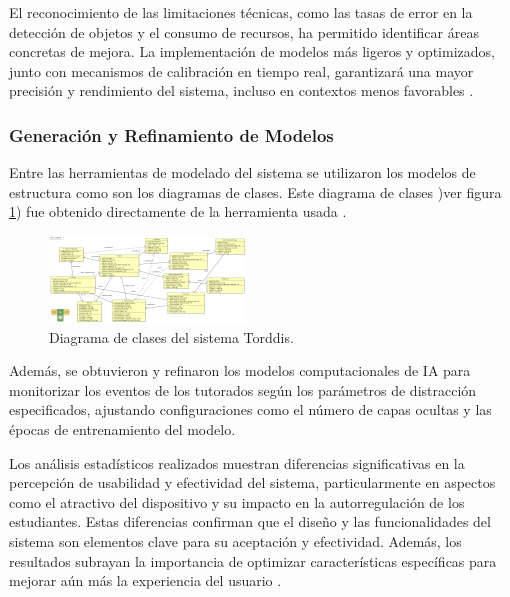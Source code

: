 \documentclass[a4paper,fleqn]{cas-sc}
\begin{document}
				El reconocimiento de las limitaciones técnicas, como las tasas de error en la detección de objetos y el consumo de recursos, ha permitido identificar áreas concretas de mejora. La implementación de modelos más ligeros y optimizados, junto con mecanismos de calibración en tiempo real, garantizará una mayor precisión y rendimiento del sistema, incluso en contextos menos favorables \citep{Falzetti2024Promoting}.
				
			\subsubsection{Generación y Refinamiento de Modelos}
				Entre las herramientas de modelado del sistema  se utilizaron los modelos de estructura como son los diagramas de clases. Este diagrama de clases )ver figura \ref{fig:ClassDiagram}) fue obtenido directamente de la herramienta usada \citep{Guerrero2024Test}.
				
				\begin{figure}[hbt!]
					\centering
					\includegraphics[frame,scale=0.5, width=\linewidth]{figs/Figure_8}
					\caption{Diagrama de clases del sistema Torddis.\label{fig:ClassDiagram}}
				\end{figure} 
				
				Además, se obtuvieron y refinaron los modelos computacionales de IA para monitorizar los eventos de los tutorados según los parámetros de distracción especificados, ajustando configuraciones como el número de capas ocultas y las épocas de entrenamiento del modelo.
				
				Los análisis estadísticos realizados muestran diferencias significativas en la percepción de usabilidad y efectividad del sistema, particularmente en aspectos como el atractivo del dispositivo y su impacto en la autorregulación de los estudiantes. Estas diferencias confirman que el diseño y las funcionalidades del sistema son elementos clave para su aceptación y efectividad. Además, los resultados subrayan la importancia de optimizar características específicas para mejorar aún más la experiencia del usuario \citep{Deng2024Does,Leiss2024Students}.
				
\end{document}
